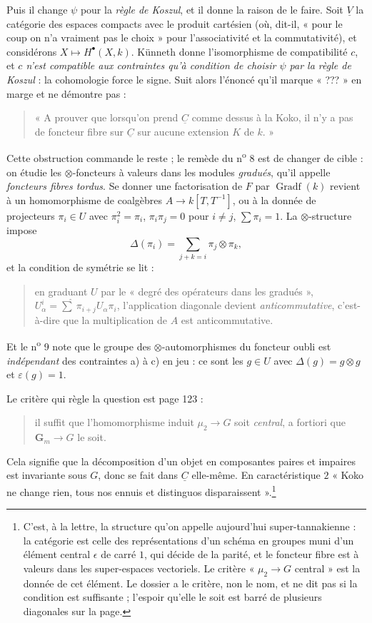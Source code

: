\documentclass[11pt,a4paper]{article}
\begin{document}
Puis il change $\psi$ pour la \emph{règle de Koszul}, et il donne la raison de
le faire. Soit $\underline{V}$ la catégorie des espaces compacts avec le produit
cartésien (où, dit-il, « pour le coup on n'a vraiment pas le choix » pour
l'associativité et la commutativité), et considérons $X \mapsto
H^{\bullet}(X,k)$. Künneth donne l'isomorphisme de compatibilité $c$, et
\emph{$c$ n'est compatible aux contraintes qu'à condition de choisir $\psi$ par
la règle de Koszul} : la cohomologie force le signe. Suit alors l'énoncé qu'il
marque « ??? » en marge et ne démontre pas :
\begin{quote}
« A prouver que lorsqu'on prend $\underline{C}$ comme dessus à la Koko, il n'y
a pas de foncteur fibre sur $\underline{C}$ sur aucune extension $K$ de
$k$. »
\end{quote}
Cette obstruction commande le reste ; le remède du n\textsuperscript{o} 8
est de changer de cible : on étudie les $\otimes$-foncteurs à valeurs dans les
modules \emph{gradués}, qu'il appelle \emph{foncteurs fibres tordus}. Se donner
une factorisation de $F$ par $\operatorname{Gradf}(k)$ revient à un
homomorphisme de coalgèbres $A \to k[T, T^{-1}]$, ou à la donnée de projecteurs
$\pi_{i} \in U$ avec $\pi_{i}^{2} = \pi_{i}$, $\pi_{i}\pi_{j} = 0$ pour
$i \neq j$, $\sum \pi_{i} = 1$. La $\otimes$-structure impose
\[
\Delta(\pi_{i}) = \sum_{j+k=i} \pi_{j} \otimes \pi_{k} ,
\]
et la condition de symétrie se lit :
\begin{quote}
en graduant $U$ par le « degré des opérateurs dans les gradués »,
$U^{i}_{\alpha} = \widehat{\sum}\,\pi_{i+j}U_{\alpha}\pi_{i}$, l'application
diagonale devient \emph{anticommutative}, c'est-à-dire que la
multiplication de $A$ est anticommutative.
\end{quote}
Et le n\textsuperscript{o} 9 note que le groupe des $\otimes$-automorphismes du
foncteur oubli est \emph{indépendant} des contraintes a) à c) en jeu : ce sont
les $g \in U$ avec $\Delta(g) = g \otimes g$ et $\varepsilon(g) = 1$.

Le critère qui règle la question est page 123 :
\begin{quote}
il suffit que l'homomorphisme induit $\mu_{2} \to G$ soit \emph{central}, a
fortiori que $\mathbf{G}_{m} \to G$ le soit.
\end{quote}
Cela signifie que la décomposition d'un objet en composantes paires et impaires
est invariante sous $G$, donc se fait dans $\underline{C}$ elle-même. En
caractéristique $2$ « Koko ne change rien, tous nos ennuis et distinguos
disparaissent ».\footnote{C'est, à la lettre, la structure qu'on appelle
aujourd'hui super-tannakienne : la catégorie est celle des représentations d'un
schéma en groupes muni d'un élément central $\epsilon$ de carré $1$, qui décide
de la parité, et le foncteur fibre est à valeurs dans les super-espaces
vectoriels. Le critère « $\mu_{2} \to G$ central » est la donnée de
cet élément. Le dossier a le critère, non le nom, et ne dit pas si la condition
est suffisante ; l'espoir qu'elle le soit est barré de plusieurs diagonales
sur la page.}
\end{document}
